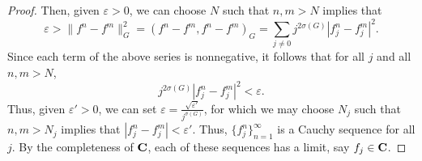 \documentclass{homework}
\begin{document}
\begin{arabicparts}
\begin{proof}
			Then, given $\varepsilon>0$, we can choose $N$ such that $n,m > N$ implies that
			\begin{equation}
				\varepsilon > \lVert f^n - f^m\rVert_G^2 = (f^n-f^m,f^n-f^m)_G = \sum_{j\ne 0}j^{2\sigma(G)}|f^n_j-f^m_j|^2.
			\end{equation}
			Since each term of the above series is nonnegative, it follows that for all $j$ and all $n,m > N$,
			\begin{equation}
				j^{2\sigma(G)}|f^n_j - f^m_j|^2 < \varepsilon.
			\end{equation}
			Thus, given $\varepsilon' > 0$, we can set $\varepsilon = \frac{\sqrt{\varepsilon'}}{j^{\sigma(G)}}$, for which we may choose $N_j$ such that $n,m > N_j$ implies that $|f^n_j - f^m_j| < \varepsilon'$. Thus, $\{f^n_j\}_{n=1}^\infty$ is a Cauchy sequence for all $j$. By the completeness of $\textbf{C}$, each of these sequences has a limit, say $f_j \in \textbf{C}$.
			

\end{proof}
\end{arabicparts}
\end{document}
